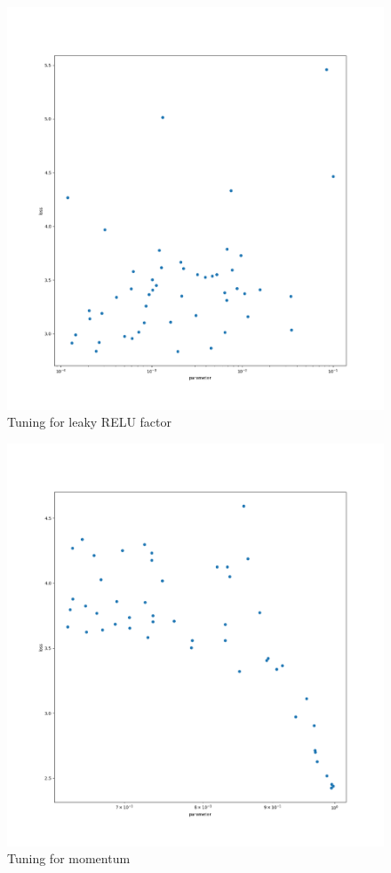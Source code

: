 \documentclass{article}
\begin{document}
\begin{figure}[H]
	\centering
	\includegraphics[width=\textwidth]{leaky.png}
	\caption{Tuning for leaky RELU factor}
\end{figure}

\begin{figure}[H]
	\centering
	\includegraphics[width=\textwidth]{mom.png}
	\caption{Tuning for momentum}
\end{figure}
\end{document}
